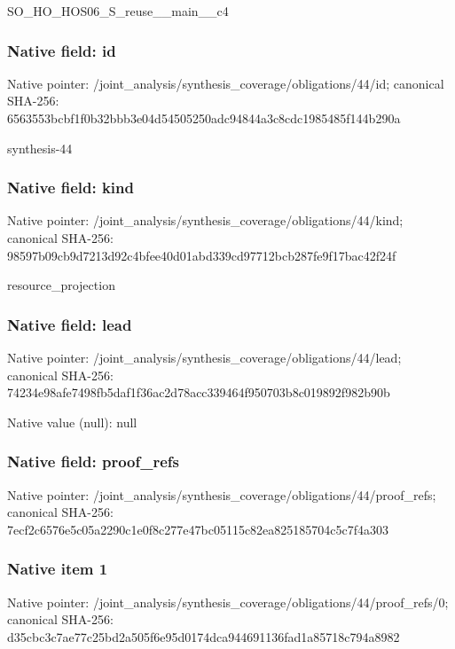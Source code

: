 \documentclass[10pt,a4paper]{article}
\begin{document}
\begingroup\raggedright\sloppy SO\_\allowbreak{}HO\_\allowbreak{}HOS06\_\allowbreak{}S\_\allowbreak{}reuse\_\allowbreak{}\_\allowbreak{}main\_\allowbreak{}\_\allowbreak{}c4\par\endgroup

\subsubsection{Native field: id}
Native pointer: /joint\_\allowbreak{}analysis/synthesis\_\allowbreak{}coverage/obligations/44/id; canonical SHA-256: 6563553bcbf1f0b32bbb3e04d54505250adc94844a3c8cdc1985485f144b290a

\begingroup\raggedright\sloppy synthesis-44\par\endgroup

\subsubsection{Native field: kind}
Native pointer: /joint\_\allowbreak{}analysis/synthesis\_\allowbreak{}coverage/obligations/44/kind; canonical SHA-256: 98597b09cb9d7213d92c4bfee40d01abd339cd97712bcb287fe9f17bac42f24f

\begingroup\raggedright\sloppy resource\_\allowbreak{}projection\par\endgroup

\subsubsection{Native field: lead}
Native pointer: /joint\_\allowbreak{}analysis/synthesis\_\allowbreak{}coverage/obligations/44/lead; canonical SHA-256: 74234e98afe7498fb5daf1f36ac2d78acc339464f950703b8c019892f982b90b

Native value (null): null

\subsubsection{Native field: proof\_\allowbreak{}refs}
Native pointer: /joint\_\allowbreak{}analysis/synthesis\_\allowbreak{}coverage/obligations/44/proof\_\allowbreak{}refs; canonical SHA-256: 7ecf2c6576e5c05a2290c1e0f8c277e47bc05115c82ea825185704c5c7f4a303

\subsubsection{Native item 1}
Native pointer: /joint\_\allowbreak{}analysis/synthesis\_\allowbreak{}coverage/obligations/44/proof\_\allowbreak{}refs/0; canonical SHA-256: d35cbc3c7ae77c25bd2a505f6e95d0174dca944691136fad1a85718c794a8982
\end{document}
